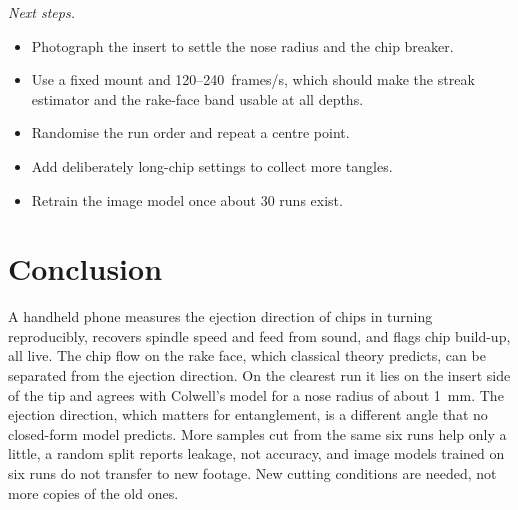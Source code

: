 \documentclass[conference,a4paper]{IEEEtran}
\begin{document}
\emph{Next steps.}
\begin{itemize}
\item Photograph the insert to settle the nose radius and the chip breaker.
\item Use a fixed mount and 120--\SI{240}{frames/s}, which should make the streak estimator and the rake-face band usable at all depths.
\item Randomise the run order and repeat a centre point.
\item Add deliberately long-chip settings to collect more tangles.
\item Retrain the image model once about 30 runs exist.
\end{itemize}

\section{Conclusion}
A handheld phone measures the ejection direction of chips in turning reproducibly, recovers spindle speed and feed from sound, and flags chip build-up, all live.
The chip flow on the rake face, which classical theory predicts, can be separated from the ejection direction.
On the clearest run it lies on the insert side of the tip and agrees with Colwell's model for a nose radius of about \SI{1}{mm}.
The ejection direction, which matters for entanglement, is a different angle that no closed-form model predicts.
More samples cut from the same six runs help only a little, a random split reports leakage, not accuracy, and image models trained on six runs do not transfer to new footage. New cutting conditions are needed, not more copies of the old ones.
\end{document}
